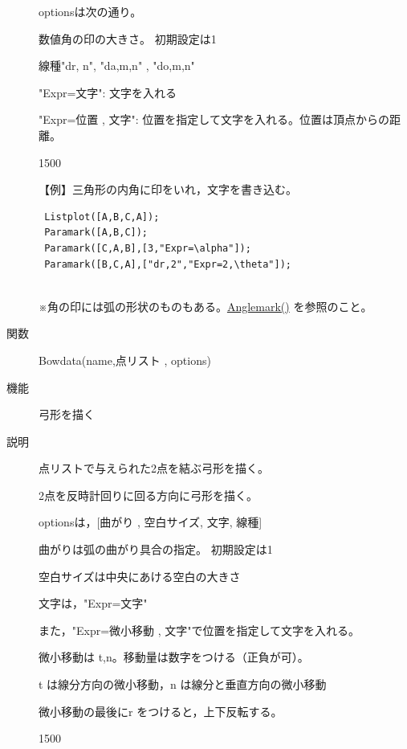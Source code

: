 \documentclass[papersize,a4paper,12pt,uplatex]{jsarticle}
\begin{document}
\begin{description}
optionsは次の通り。

数値角の印の大きさ。 初期設定は1

線種"dr, n", "da,m,n" , "do,m,n"

"Expr=文字": 文字を入れる

"Expr=位置 , 文字": 位置を指定して文字を入れる。位置は頂点からの距離。

\vspace{\baselineskip}
\begin{layer}{150}{0}
\end{layer}

【例】三角形の内角に印をいれ，文字を書き込む。

\begin{verbatim}
 Listplot([A,B,C,A]);
 Paramark([A,B,C]);
 Paramark([C,A,B],[3,"Expr=\alpha"]);
 Paramark([B,C,A],["dr,2","Expr=2,\theta"]);
 
\end{verbatim}

※角の印には弧の形状のものもある。\hyperlink{anglemark}{Anglemark()} を参照のこと。\\

\vspace{\baselineskip}
\hypertarget{bowdata}{}
\item[関数]Bowdata(name,点リスト , options)
\item[機能]弓形を描く
\item[説明]点リストで与えられた2点を結ぶ弓形を描く。

2点を反時計回りに回る方向に弓形を描く。

optionsは，[曲がり , 空白サイズ, 文字, 線種]

曲がりは弧の曲がり具合の指定。 初期設定は1

空白サイズは中央にあける空白の大きさ

文字は，"Expr=文字" 

また，"Expr=微小移動 , 文字"で位置を指定して文字を入れる。

微小移動は t,n。移動量は数字をつける（正負が可）。

 t は線分方向の微小移動，n は線分と垂直方向の微小移動

 微小移動の最後にr をつけると，上下反転する。

\vspace{\baselineskip}
 \begin{layer}{150}{0}
 \end{layer}


\end{description}
\end{document}
